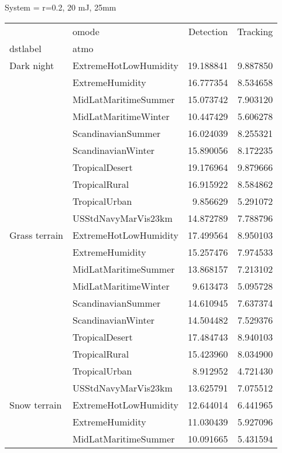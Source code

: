 \clearpage
System =  r=0.2, 20 mJ, 25mm

\begin{tabular}{llrr}
\toprule
             & omode &  Detection &  Tracking \\
dstlabel & atmo &            &           \\
\midrule
Dark night & ExtremeHotLowHumidity &  19.188841 &  9.887850 \\
             & ExtremeHumidity &  16.777354 &  8.534658 \\
             & MidLatMaritimeSummer &  15.073742 &  7.903120 \\
             & MidLatMaritimeWinter &  10.447429 &  5.606278 \\
             & ScandinavianSummer &  16.024039 &  8.255321 \\
             & ScandinavianWinter &  15.890056 &  8.172235 \\
             & TropicalDesert &  19.176964 &  9.879666 \\
             & TropicalRural &  16.915922 &  8.584862 \\
             & TropicalUrban &   9.856629 &  5.291072 \\
             & USStdNavyMarVis23km &  14.872789 &  7.788796 \\
Grass terrain & ExtremeHotLowHumidity &  17.499564 &  8.950103 \\
             & ExtremeHumidity &  15.257476 &  7.974533 \\
             & MidLatMaritimeSummer &  13.868157 &  7.213102 \\
             & MidLatMaritimeWinter &   9.613473 &  5.095728 \\
             & ScandinavianSummer &  14.610945 &  7.637374 \\
             & ScandinavianWinter &  14.504482 &  7.529376 \\
             & TropicalDesert &  17.484743 &  8.940103 \\
             & TropicalRural &  15.423960 &  8.034900 \\
             & TropicalUrban &   8.912952 &  4.721430 \\
             & USStdNavyMarVis23km &  13.625791 &  7.075512 \\
Snow terrain & ExtremeHotLowHumidity &  12.644014 &  6.441965 \\
             & ExtremeHumidity &  11.030439 &  5.927096 \\
             & MidLatMaritimeSummer &  10.091665 &  5.431594 \\

\end{tabular}

